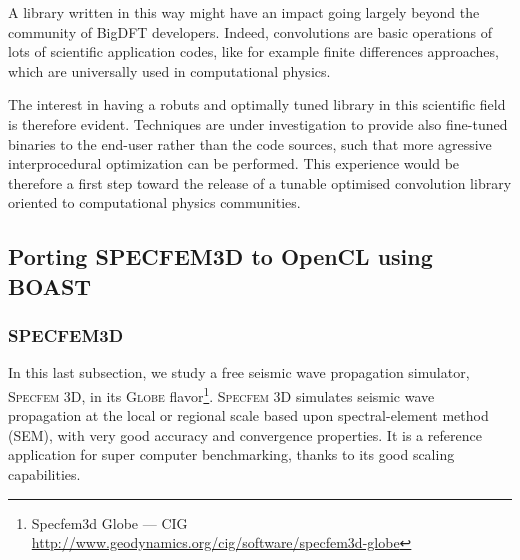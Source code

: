 \documentclass[11pt, a4paper, twoside]{montblanc}
\newcommand{\productname}[1]{\textsc{#1}}
\newcommand{\Specfem}{\productname{Specfem 3D}\xspace}
\begin{document}
A library written in this way might have an impact going largely beyond the
community of BigDFT developers.  Indeed, convolutions are basic operations of
lots of scientific application codes, like for example finite differences
approaches, which are universally used in computational physics.

The interest in having a robuts and optimally tuned library in this scientific
field is therefore evident.  Techniques are under investigation to provide also
fine-tuned binaries to the end-user rather than the code sources, such that
more agressive interprocedural optimization can be performed.  This experience
would be therefore a first step toward the release of a tunable optimised
convolution library oriented to computational physics communities.
% 
% 
% 
% 
 


\subsection{Porting SPECFEM3D to OpenCL using BOAST}
\label{subsec:specfem}

\subsubsection{SPECFEM3D}

In this last subsection, we study a free seismic wave propagation
simulator, \Specfem, in its \productname{Globe}
flavor\footnote{Specfem3d Globe --- CIG
  \url{http://www.geodynamics.org/cig/software/specfem3d-globe}}. \Specfem
simulates seismic wave propagation at the local or regional scale
based upon spectral-element method (SEM), with very good accuracy and
convergence properties. It is a reference application for super
computer benchmarking, thanks to its good scaling capabilities.
\end{document}
